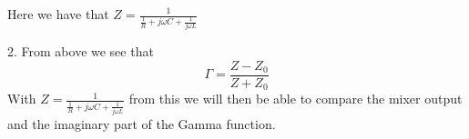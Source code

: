 Here we have that $Z =\frac{1}{\frac{1}{R} +j\omega C+\frac{1}{j\omega L}} $

2. 
From above we see that 
\begin{equation}
    \Gamma = \frac{Z-Z_0}{Z+Z_0}
\end{equation}
With $Z =\frac{1}{\frac{1}{R} +j\omega C+\frac{1}{j\omega L}}$ from this we will then be able to compare the mixer output and the imaginary part of the Gamma function. 